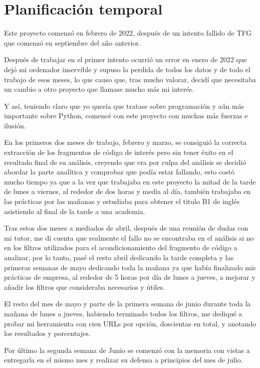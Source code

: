 \documentclass[a4paper, 12pt]{book}
\begin{document}
\section{Planificación temporal}
\label{sec:planificacion-temporal}

Este proyecto comenzó en febrero de 2022, después de un intento fallido de TFG que comenzó en septiembre del año anterior.

Después de trabajar en el primer intento ocurrió un error en enero de 2022 que dejó mi ordenador inservible y supuso la perdida de todos los datos y de todo el trabajo de esos meses, lo que causo que, tras mucho valorar, decidí que necesitaba un cambio a otro proyecto que llamase mucho más mi interés.

Y así, teniendo claro que yo quería que tratase sobre programación y aún más importante sobre Python, comencé con este proyecto con muchas más fuerzas e ilusión.

En los primeros dos meses de trabajo, febrero y marzo, se consiguió la correcta extracción de los fragmentos de código de interés pero sin tener éxito en el resultado final de su análisis, creyendo que era por culpa del análisis se decidió abordar la parte analítica y comprobar que podía estar fallando, esto costó mucho tiempo ya que a la vez que trabajaba en este proyecto la mitad de la tarde de lunes a viernes, al rededor de dos horas y media al día, también trabajaba en las prácticas por las mañanas y estudiaba para obtener el titulo B1 de inglés asistiendo al final de la tarde a una academia.

Tras estos dos meses a mediados de abril, después de una reunión de dudas con mi tutor, me di cuenta que realmente el fallo no se encontraba en el análisis si no en los filtros utilizados para el acondicionamiento del fragmento de código a analizar, por lo tanto, pasé el resto abril dedicando la tarde completa y las primeras semanas de mayo dedicando toda la mañana ya que había finalizado mis prácticas de empresa, al rededor de 5 horas por día de lunes a jueves, a mejorar y añadir los filtros que consideraba necesarios y útiles.

El resto del mes de mayo y parte de la primera semana de junio durante toda la mañana de lunes a jueves, habiendo terminado todos los filtros, me dediqué a probar mi herramienta con cien URLs por opción, doscientas en total, y anotando los resultados y porcentajes.

Por último la segunda semana de Junio se comenzó con la memoria con vistas a entregarla en el mismo mes y realizar su defensa a principios del mes de julio. 
\end{document}
